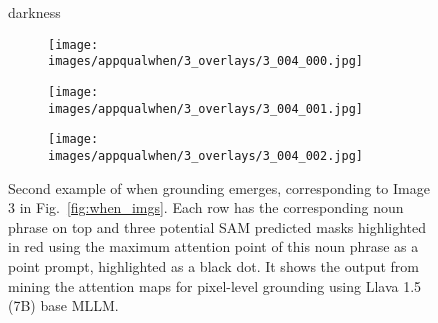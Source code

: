 \begin{figure}[t]
darkness
\begin{subfigure}{0.16\textwidth}
\texttt{[image: images/appqualwhen/3\_overlays/3\_004\_000.jpg]}
\end{subfigure}%
\begin{subfigure}{0.16\textwidth}
\texttt{[image: images/appqualwhen/3\_overlays/3\_004\_001.jpg]}
\end{subfigure}%
\begin{subfigure}{0.16\textwidth}
\texttt{[image: images/appqualwhen/3\_overlays/3\_004\_002.jpg]}
\end{subfigure}
\caption{Second example of when grounding emerges, corresponding to Image 3 in Fig.~\ref{fig:when_imgs}. Each row has the corresponding noun phrase on top and three potential SAM predicted masks highlighted in red using the maximum attention point of this noun phrase as a point prompt, highlighted as a black dot. It shows the output from mining the attention maps for pixel-level grounding using Llava 1.5 (7B) base MLLM.}
\label{fig:when2}
\end{figure}

